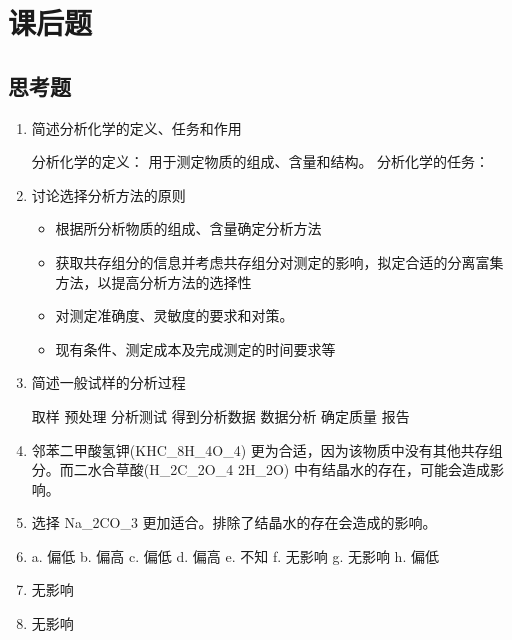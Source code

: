 \section{课后题}

\subsection{思考题}

\begin{enumerate}
	\item 简述分析化学的定义、任务和作用

		分析化学的定义： 用于测定物质的组成、含量和结构。
		分析化学的任务：

	\item 讨论选择分析方法的原则

		\begin{itemize}
			\item 根据所分析物质的组成、含量确定分析方法
			\item 获取共存组分的信息并考虑共存组分对测定的影响，拟定合适的分离富集方法，以提高分析方法的选择性
			\item 对测定准确度、灵敏度的要求和对策。
			\item 现有条件、测定成本及完成测定的时间要求等
			
		\end{itemize}

	\item 简述一般试样的分析过程

		取样 \rightarrow 预处理 \rightarrow 分析测试 \rightarrow 得到分析数据 \rightarrow 数据分析 \rightarrow 确定质量 \rightarrow 报告

	\item 

		邻苯二甲酸氢钾(KHC_8H_4O_4) 更为合适，因为该物质中没有其他共存组分。而二水合草酸(H_2C_2O_4 \dot 2H_2O) 中有结晶水的存在，可能会造成影响。


	\item 
		选择 Na_2CO_3 更加适合。排除了结晶水的存在会造成的影响。

	\item
		a. 偏低
		b. 偏高
		c. 偏低
		d. 偏高
		e. 不知
		f. 无影响
		g. 无影响
		h. 偏低

	\item 
		无影响

	\item 
		无影响

\end{enumerate}

